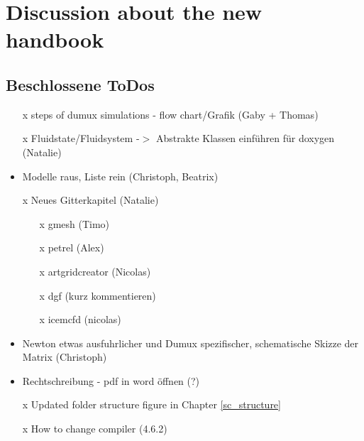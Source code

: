\chapter*{Discussion about the new handbook}
\section*{Beschlossene ToDos}
\begin{itemize}
  \item[x] steps of dumux simulations - flow chart/Grafik (Gaby + Thomas)
  \item[x] Fluidstate/Fluidsystem -$>$ Abstrakte Klassen einführen für doxygen (Natalie)
  \item Modelle raus, Liste rein (Christoph, Beatrix)
  \item[x] Neues Gitterkapitel (Natalie)
  \begin{itemize}
    \item[x] gmesh (Timo)
    \item[x] petrel (Alex)
    \item[x] artgridcreator (Nicolas)
    \item[x] dgf (kurz kommentieren)
    \item[x] icemcfd (nicolas)
  \end{itemize}
  \item Newton etwas ausfuhrlicher und Dumux spezifischer, schematische
        Skizze der Matrix (Christoph)
  \item Rechtschreibung - pdf in word öffnen (?)
  \item[x] Updated folder structure figure in Chapter \ref{sc_structure}
  \item[x] How to change compiler (4.6.2)
\end{itemize}


